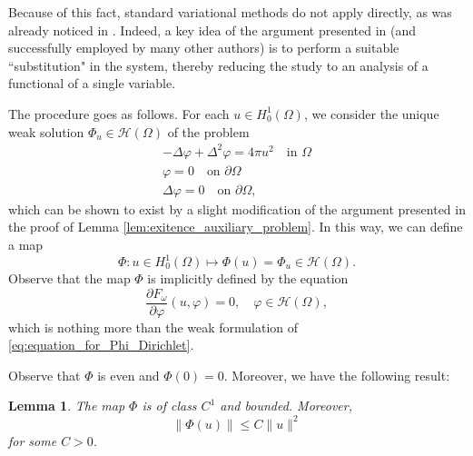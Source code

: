 \documentclass[10pt,a4paper]{amsart}
\numberwithin{equation}{section}
\newtheorem{lemma}[theo]{Lemma}
\begin{document}
Because of this fact, standard variational methods do not apply directly, as was 
already noticed in \cite{BenciFortunato1998}. Indeed, a key idea of the argument 
presented in \cite{BenciFortunato1998} (and successfully employed by many other 
authors) is to perform a suitable ``substitution" in the system, thereby reducing 
the study to an analysis of a functional of a single variable.

The procedure goes as follows. For each $u \in H_0^1(\Omega)$, we consider the 
unique weak solution $\Phi_u \in \mathcal{H}(\Omega) $ of the problem
\begin{equation}
 \label{eq:equation_for_Phi_Dirichlet}
\begin{gathered}
 - \Delta \varphi + \Delta^2 \varphi  =  4 \pi u^2  \quad \text{in } \Omega \\
 \varphi  =  0  \quad \text{on } \partial\Omega \\
 \Delta \varphi  =  0  \quad \text{on } \partial\Omega,
 \end{gathered}
\end{equation}
which can be shown to exist by a slight modification of the argument presented 
in the proof of Lemma \ref{lem:exitence_auxiliary_problem}. 
In this way, we can define a map
\[
 \Phi: u \in H_0^1(\Omega) \mapsto \Phi(u) = \Phi_u \in \mathcal{H}(\Omega) .
\]
Observe that the map $\Phi$ is implicitly defined by the equation
\begin{equation}
 \label{eq:implicit_def_Phi_Dirichlet}
 \frac{\partial F_\omega}{\partial \varphi} (u, \varphi) = 0, \quad \varphi \in \mathcal{H}(\Omega) ,
\end{equation}
which is nothing more than the weak formulation of 
\eqref{eq:equation_for_Phi_Dirichlet}.

Observe that $\Phi$ is even and $\Phi(0) = 0$. Moreover, we have the following result:

\begin{lemma}
 \label{lem:map_Phi}
The map $\Phi$ is of class $C^1$ and bounded. Moreover,
 \begin{equation}
 \label{eq:bound_Phi}
 \|\Phi(u)\| \leq C\|u\|^2
 \end{equation}
 for some $C > 0$.
\end{lemma}
\end{document}
